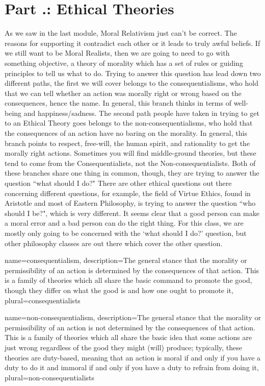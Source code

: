 \section{Part \thechapcount.\theseccount: Ethical Theories}
As we saw in the last module, Moral Relativism just can't be correct. The reasons for supporting it contradict each other or it leads to truly awful beliefs. If we still want to be Moral Realists, then we are going to need to go with something objective, a theory of morality which has a set of rules or guiding principles to tell us what to do.  Trying to answer this question has lead down two different paths, the first we will cover belongs to the \Glspl{consequentialism}, who hold that we can tell whether an action was morally right or wrong based on the consequences, hence the name. In general, this branch thinks in terms of well-being and happiness/sadness. The second path people have taken in trying to get to an Ethical Theory goes belongs to the \Glspl{non-consequentialism}, who hold that the consequences of an action have no baring on the morality. In general, this branch points to respect, free-will, the human spirit, and rationality to get the morally right actions. Sometimes you will find middle-ground theories, but these tend to come from the Consequentialists, not the Non-consequentialists. Both of these branches share one thing in common, though, they are trying to answer the question ``what should I do?" There are other ethical questions out there concerning different questions, for example, the field of Virtue Ethics, found in Aristotle and most of Eastern Philosophy, is trying to answer the question ``who should I be?", which is very different. It seems clear that a good person can make a moral error and a bad person can do the right thing.  For this class, we are mostly only going to be concerned with the `what should I do?' question, but other philosophy classes are out there which cover the other question.

{
  name=consequentialism,
  description={The general stance that the morality or permissibility of an action is determined by the consequences of that action. This is a family of theories which all share the basic command to promote the good, though they differ on what the good is and how one ought to promote it},
  plural=consequentialists
}


{
  name=non-consequentialism,
  description={The general stance that the morality or permissibility of an action is not determined by the consequences of that action. This is a family of theories which all share the basic idea that some actions are just wrong regardless of the good they might (will) produce; typically, these theories are duty-based, meaning that an action is moral if and only if you have a duty to do it and immoral if and only if you have a duty to refrain from doing it},
  plural=non-consequentialists
}

